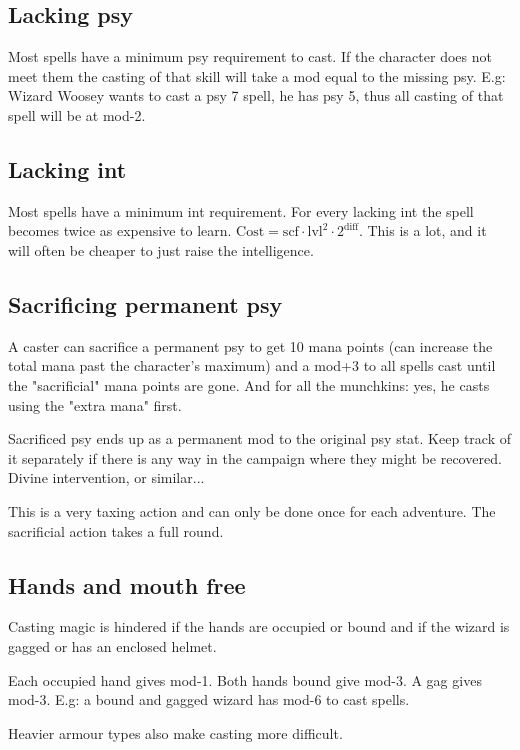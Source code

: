 \subsection*{Lacking psy}
Most spells have a minimum psy requirement to cast. If the character does not meet them the casting of that skill will take a mod equal to the missing psy.
E.g: Wizard Woosey wants to cast a psy 7 spell, he has psy 5, thus all casting of that spell will be at mod-2.


\subsection*{Lacking int}
Most spells have a minimum int requirement. For every lacking int the spell becomes twice as expensive to learn. $\mathrm{Cost} = \mathrm{scf} \cdot \mathrm{lvl}^2 \cdot 2^{\mathrm{diff}}$. This is a lot, and it will often be cheaper to just raise the intelligence.


\subsection*{Sacrificing permanent psy}
A caster can sacrifice a permanent psy to get 10 mana points (can increase the total mana past the character's maximum) and a mod+3 to all spells cast until the "sacrificial" mana points are gone. And for all the munchkins: yes, he casts using the "extra mana" first.

Sacrificed psy ends up as a permanent mod to the original psy stat. Keep track of it separately if there is any way in the campaign where they might be recovered. Divine intervention, or similar...

This is a very taxing action and can only be done once for each adventure. The sacrificial action takes a full round.


\subsection*{Hands and mouth free}
Casting magic is hindered if the hands are occupied or bound and if the wizard is gagged or has an enclosed helmet.

Each occupied hand gives mod-1. Both hands bound give mod-3. A gag gives mod-3.
E.g: a bound and gagged wizard has mod-6 to cast spells.

Heavier armour types also make casting more difficult.


